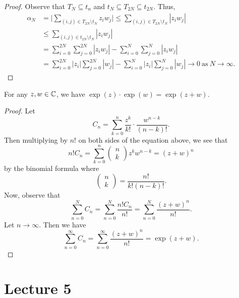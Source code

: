 \documentclass[a4paper]{report}
\begin{document}
\begin{proof}
Observe that \( {T}_{N} \subseteq  {t}_{n} \) and \( {t}_{N} \subseteq  {T}_{2N } \subseteq  {t}_{2N} \). Thus, 
\begin{align*}
    {\alpha}_{N} &= \Big|  \sum_{ (i,j) \in {T}_{2N} \setminus  {t}_{N} }^{  } {z}_{i} {w}_{j} \Big| \leq \sum_{ (i,j) \in {T}_{2N} \setminus {t}_{N} }^{  } | {z}_{i} {w}_{j} |  \\
                 &\leq \sum_{ (i,j) \in {t}_{2N} \setminus  {t}_{N} }^{  } | {z}_{i} {w}_{j} |  \\
                 &= \sum_{ i=0  }^{ 2N  } \sum_{ j = 0  }^{ 2N  } | {z}_{i} {w}_{j} |  - \sum_{ i = 0  }^{  N  } \sum_{ j = 0  }^{  N  } | {z}_{i} {w}_{j} |  \\
                 &= \sum_{ i = 0  }^{  2 N  } | {z}_{i} | \sum_{ j = 0  }^{  2N  } | {w}_{j} |  - \sum_{ i = 0  }^{  N  } | {z}_{i} |  \sum_{ j = 0  }^{  N  } | {w}_{j} | \to 0  \ \text{as} \ N \to \infty.
\end{align*}


\end{proof}

\begin{corollary}
   For any \( z,w \in \mathbb{C}  \), we have \( \exp(z) \cdot \exp(w) = \exp(z + w) \). 
\end{corollary}
\begin{proof}
Let
\[  {C}_{n} = \sum_{ k = 0  }^{ n  } \frac{ z^{k } }{  k!  }  \cdot \frac{ w^{n-k} }{ (n-k)! }. \]
Then multiplying by \( n!  \) on both sides of the equation above, we see that
\[  n! {C}_{n} = \sum_{ k = 0  }^{ n  } \begin{pmatrix} n \\ k  \end{pmatrix} z^{k } w^{n - k } = (z + w)^{n} \]
by the binomial formula where
\[  \begin{pmatrix} n \\ k  \end{pmatrix}  = \frac{ n!  }{ k! (n- k)! }. \]
Now, observe that
\[  \sum_{ n = 0  }^{  N  } {C}_{n} = \sum_{ n = 0  }^{  N  } \frac{ n! {C}_{n}  }{  n!  }  = \sum_{ n = 0  }^{  N  } \frac{ (z + w )^{n} }{ n!  }. \]
Let \( n \to \infty  \). Then we have
\[  \sum_{ n = 0  }^{  \infty  } {C}_{n} = \sum_{ n = 0  }^{  \infty  } \frac{ (z+w)^{n} }{ n!  }  = \exp(z+w). \]

\end{proof}


\section{Lecture 5}
\end{document}
